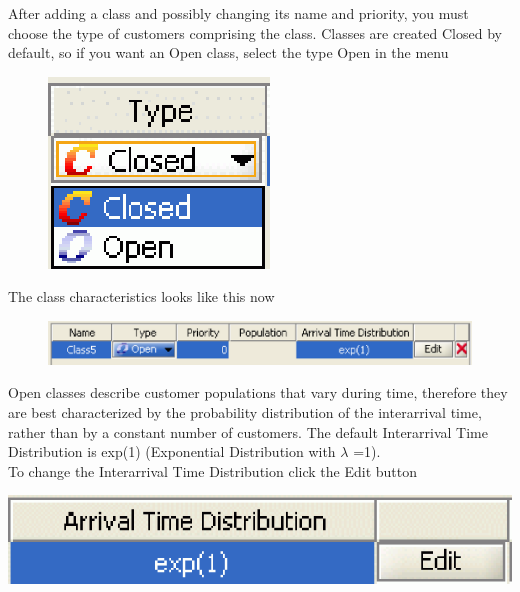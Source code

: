 After adding a class and possibly changing its name and priority, you must choose the type of customers comprising the class. Classes are created Closed by default, so if you want an Open class, select the type Open in the menu\\
\begin{figure}
\begin{center}
\includegraphics[scale=.5]{img/jsim/type_class.eps}
\end{center}
\end{figure}

The class characteristics looks like this now
\begin{figure}
\begin{center}
\includegraphics[scale=.5]{img/jsim/open_class1.eps}

\end{center}
\end{figure}

Open classes describe customer populations that vary during time,
therefore they are best characterized by the probability
distribution of the interarrival time, rather than by a constant
number of customers. The default Interarrival Time Distribution is
exp(1) (Exponential Distribution with $\lambda$ =1).\\ To change
the Interarrival Time Distribution click the Edit button
\begin{center}
\includegraphics[scale=.5]{img/jsim/arrival_time_distribution1.eps}
\end{center}

